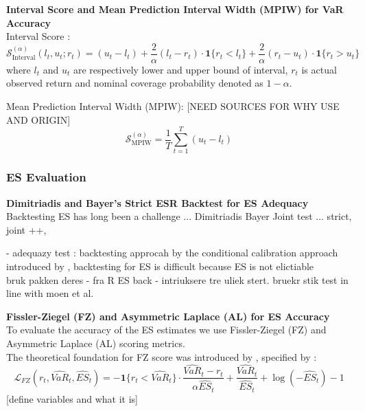 \textbf{Interval Score and Mean Prediction Interval Width (MPIW) for VaR Accuracy} \\

Interval Score \parencite{gneiting2007}: 
\begin{equation}
\mathcal{S}_{\text{Interval}}^{(\alpha)}(l_t, u_t; r_t) =
(u_t - l_t) 
+ \frac{2}{\alpha} (l_t - r_t) \cdot \mathbf{1}\{r_t < l_t\} 
+ \frac{2}{\alpha} (r_t - u_t) \cdot \mathbf{1}\{r_t > u_t\}
\end{equation}
where $l_t$ and $u_t$ are respectively lower and upper bound of interval, $r_t$ is actual observed return and nominal coverage probability denoted as $1-\alpha$. 

Mean Prediction Interval Width (MPIW): [NEED SOURCES FOR WHY USE AND ORIGIN]
\begin{equation}
\mathcal{S}_{\text{MPIW}}^{(\alpha)} = \frac{1}{T} \sum_{t=1}^{T} (u_t - l_t)
\end{equation}




\subsubsection{ES Evaluation}



\textbf{Dimitriadis and Bayer's Strict ESR Backtest for ES Adequacy}\\

Backtesting ES has long been a challenge ... Dimitriadis Bayer Joint test ... strict, joint ++, 

- adequazy test : backtesting approcah by the conditional calibration approach introduced by \parencite{Bayer2020}, backtesting for ES is difficult because ES is not elictiable \\

bruk pakken deres - fra R ES back - intriuksere tre uliek stert. bruekr stik test in line with moen et al. 


\textbf{Fissler-Ziegel (FZ) and Asymmetric Laplace (AL) for ES Accuracy} \\
To evaluate the accuracy of the ES estimates we use Fissler-Ziegel (FZ) and Asymmetric Laplace (AL) scoring metrics.  \\

The theoretical foundation for FZ score was introduced by \textcite{fissler2016fz}, specified by \textcite{Patton2019}:
\begin{equation}
\mathcal{L}_{FZ}(r_t, \widehat{VaR}_t, \widehat{ES}_t) = 
- \mathbf{1}\{r_t < \widehat{VaR}_t\} \cdot \frac{\widehat{VaR}_t - r_t}{\alpha \widehat{ES}_t} 
+ \frac{\widehat{VaR}_t}{\widehat{ES}_t} 
+ \log(-\widehat{ES}_t) - 1
\end{equation}
[define variables and what it is] \\

